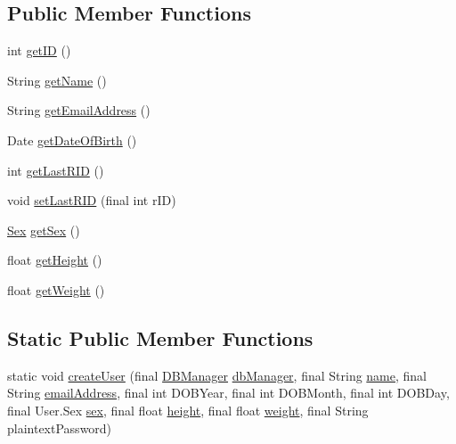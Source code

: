 \subsection*{Public Member Functions}
\begin{DoxyCompactItemize}
\item 
int \mbox{\hyperlink{classcom_1_1activitytracker_1_1_user_a967ae64a7818e9e532ad6d361650d8e6}{get\+ID}} ()
\item 
String \mbox{\hyperlink{classcom_1_1activitytracker_1_1_user_a6b39e49a1e49279035fd61a667d14f64}{get\+Name}} ()
\item 
String \mbox{\hyperlink{classcom_1_1activitytracker_1_1_user_a79d69ca90216e0552ac4cae9778ea40d}{get\+Email\+Address}} ()
\item 
Date \mbox{\hyperlink{classcom_1_1activitytracker_1_1_user_a40da04454cea10bb5c6e6125a7a9cf64}{get\+Date\+Of\+Birth}} ()
\item 
int \mbox{\hyperlink{classcom_1_1activitytracker_1_1_user_a7040d0d696d79f9592eec6ac507de3c7}{get\+Last\+R\+ID}} ()
\item 
void \mbox{\hyperlink{classcom_1_1activitytracker_1_1_user_a9e91c79596a9a4dfda7b3453b61ff8d2}{set\+Last\+R\+ID}} (final int r\+ID)
\item 
\mbox{\hyperlink{enumcom_1_1activitytracker_1_1_user_1_1_sex}{Sex}} \mbox{\hyperlink{classcom_1_1activitytracker_1_1_user_ac184fdb794730df3fedf3b147283a5fd}{get\+Sex}} ()
\item 
float \mbox{\hyperlink{classcom_1_1activitytracker_1_1_user_a2a80ab659d02a07176b1793354131c00}{get\+Height}} ()
\item 
float \mbox{\hyperlink{classcom_1_1activitytracker_1_1_user_ad15d7b4f96adb6d1a14054bf3eb7e4e0}{get\+Weight}} ()
\end{DoxyCompactItemize}
\subsection*{Static Public Member Functions}
\begin{DoxyCompactItemize}
\item 
static void \mbox{\hyperlink{classcom_1_1activitytracker_1_1_user_ab9d405e0fc6916bbf4836ce6ab762bea}{create\+User}} (final \mbox{\hyperlink{classcom_1_1activitytracker_1_1_d_b_manager}{D\+B\+Manager}} \mbox{\hyperlink{classcom_1_1activitytracker_1_1_user_a8c8b36433447a235f2b4940b92e839c1}{db\+Manager}}, final String \mbox{\hyperlink{classcom_1_1activitytracker_1_1_user_a49bfb4c8ebf8b7a377df01b5f0b2d7bc}{name}}, final String \mbox{\hyperlink{classcom_1_1activitytracker_1_1_user_ac2fdb9a858d0295e52c5f8bc179e3137}{email\+Address}}, final int D\+O\+B\+Year, final int D\+O\+B\+Month, final int D\+O\+B\+Day, final User.\+Sex \mbox{\hyperlink{classcom_1_1activitytracker_1_1_user_adcbddd2e965af4e227f7cf0582a3e13d}{sex}}, final float \mbox{\hyperlink{classcom_1_1activitytracker_1_1_user_a83cdfe6f520a4e18e8710e8e11f8c3d6}{height}}, final float \mbox{\hyperlink{classcom_1_1activitytracker_1_1_user_a8a30c6c08983e513b462bcc035434c9e}{weight}}, final String plaintext\+Password)
\end{DoxyCompactItemize}
